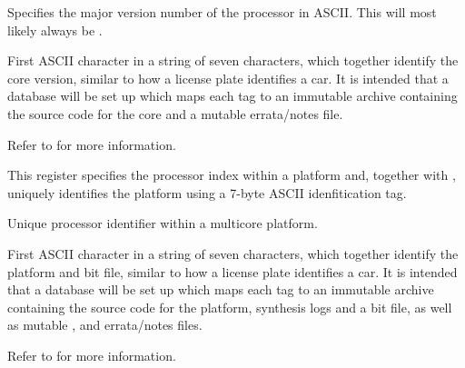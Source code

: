 Specifies the major version number of the \rvex{} processor in ASCII. This will
most likely always be .

First ASCII character in a string of seven characters, which together identify 
the core version, similar to how a license plate identifies a car. It is 
intended that a database will be set up which maps each tag to an immutable 
archive containing the source code for the core and a mutable errata/notes file.



Refer to  for more information.



This register specifies the processor index within a platform and, together with
, uniquely identifies the platform using a 7-byte ASCII
idenfitication tag.

\reset{********}
Unique processor identifier within a multicore platform.

First ASCII character in a string of seven characters, which together identify 
the platform and bit file, similar to how a license plate identifies a car. It 
is intended that a database will be set up which maps each tag to an immutable 
archive containing the source code for the platform, synthesis logs and a bit 
file, as well as mutable ,  and errata/notes 
files.



Refer to  for more information.



